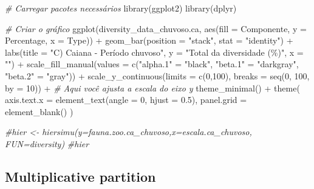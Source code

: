 \documentclass[
  letterpaper,
  DIV=11,
  numbers=noendperiod]{scrartcl}
\newenvironment{Shaded}{}{}
\newcommand{\AttributeTok}[1]{\textcolor[rgb]{0.49,0.56,0.16}{#1}}
\newcommand{\CommentTok}[1]{\textcolor[rgb]{0.38,0.63,0.69}{\textit{#1}}}
\newcommand{\DecValTok}[1]{\textcolor[rgb]{0.25,0.63,0.44}{#1}}
\newcommand{\FloatTok}[1]{\textcolor[rgb]{0.25,0.63,0.44}{#1}}
\newcommand{\FunctionTok}[1]{\textcolor[rgb]{0.02,0.16,0.49}{#1}}
\newcommand{\NormalTok}[1]{#1}
\newcommand{\OtherTok}[1]{\textcolor[rgb]{0.00,0.44,0.13}{#1}}
\newcommand{\SpecialCharTok}[1]{\textcolor[rgb]{0.25,0.44,0.63}{#1}}
\newcommand{\StringTok}[1]{\textcolor[rgb]{0.25,0.44,0.63}{#1}}
\begin{document}
\begin{Shaded}
\begin{Highlighting}[numbers=left,,]
\CommentTok{\# Carregar pacotes necessários}
\FunctionTok{library}\NormalTok{(ggplot2)}
\FunctionTok{library}\NormalTok{(dplyr)}

\CommentTok{\# Criar o gráfico}
\FunctionTok{ggplot}\NormalTok{(diversity\_data\_chuvoso.ca, }\FunctionTok{aes}\NormalTok{(}\AttributeTok{fill =}\NormalTok{ Componente, }\AttributeTok{y =}\NormalTok{ Percentage, }\AttributeTok{x =}\NormalTok{ Type)) }\SpecialCharTok{+}
  \FunctionTok{geom\_bar}\NormalTok{(}\AttributeTok{position =} \StringTok{"stack"}\NormalTok{, }\AttributeTok{stat =} \StringTok{"identity"}\NormalTok{) }\SpecialCharTok{+}
  \FunctionTok{labs}\NormalTok{(}\AttributeTok{title =} \StringTok{"C) Caiana {-} Período chuvoso"}\NormalTok{,}
       \AttributeTok{y =} \StringTok{"Total da diversidade (\%)"}\NormalTok{,}
       \AttributeTok{x =} \StringTok{""}\NormalTok{) }\SpecialCharTok{+}
  \FunctionTok{scale\_fill\_manual}\NormalTok{(}\AttributeTok{values =} \FunctionTok{c}\NormalTok{(}\StringTok{"alpha.1"} \OtherTok{=} \StringTok{"black"}\NormalTok{,}
                               \StringTok{"beta.1"} \OtherTok{=} \StringTok{"darkgray"}\NormalTok{,}
                               \StringTok{"beta.2"} \OtherTok{=} \StringTok{"gray"}\NormalTok{)) }\SpecialCharTok{+}
  \FunctionTok{scale\_y\_continuous}\NormalTok{(}\AttributeTok{limits =} \FunctionTok{c}\NormalTok{(}\DecValTok{0}\NormalTok{,}\DecValTok{100}\NormalTok{), }\AttributeTok{breaks =} \FunctionTok{seq}\NormalTok{(}\DecValTok{0}\NormalTok{, }\DecValTok{100}\NormalTok{, }\AttributeTok{by =} \DecValTok{10}\NormalTok{)) }\SpecialCharTok{+} \CommentTok{\# Aqui você ajusta a escala do eixo y}
  \FunctionTok{theme\_minimal}\NormalTok{() }\SpecialCharTok{+}
  \FunctionTok{theme}\NormalTok{(}
    \AttributeTok{axis.text.x =} \FunctionTok{element\_text}\NormalTok{(}\AttributeTok{angle =} \DecValTok{0}\NormalTok{, }\AttributeTok{hjust =} \FloatTok{0.5}\NormalTok{),}
    \AttributeTok{panel.grid =} \FunctionTok{element\_blank}\NormalTok{()}
\NormalTok{  )}

\CommentTok{\#hier \textless{}{-} hiersimu(y=fauna.zoo.ca\_chuvoso,x=escala.ca\_chuvoso, FUN=diversity)}
\CommentTok{\#hier}
\end{Highlighting}
\end{Shaded}

\subsection{Multiplicative partition}\label{multiplicative-partition}
\end{document}
